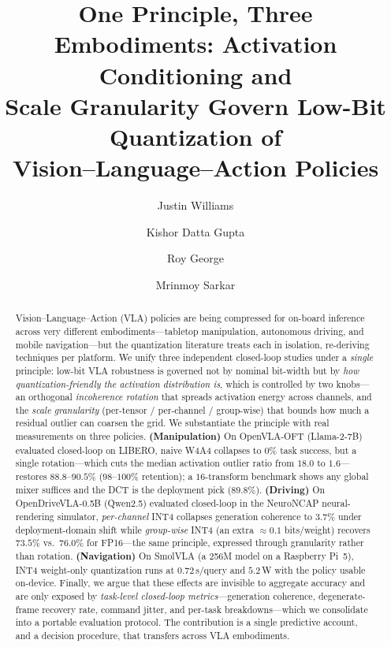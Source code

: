 \documentclass[11pt]{article}
\title{\textbf{One Principle, Three Embodiments: Activation Conditioning and\\
Scale Granularity Govern Low-Bit Quantization of\\
Vision--Language--Action Policies}}
\author[1]{Justin Williams}
\author[1]{Kishor Datta Gupta}
\author[1]{Roy George}
\author[1]{Mrinmoy Sarkar}
\affil[1]{Clark Atlanta University \quad \texttt{justinwilliamstech693@gmail.com}}
\date{}
\begin{document}
\maketitle

\begin{abstract}
Vision--Language--Action (VLA) policies are being compressed for on-board inference across very
different embodiments---tabletop manipulation, autonomous driving, and mobile navigation---but the
quantization literature treats each in isolation, re-deriving techniques per platform. We unify
three independent closed-loop studies under a \emph{single} principle: low-bit VLA robustness is
governed not by nominal bit-width but by \emph{how quantization-friendly the activation distribution
is}, which is controlled by two knobs---an orthogonal \emph{incoherence rotation} that spreads
activation energy across channels, and the \emph{scale granularity} (per-tensor / per-channel /
group-wise) that bounds how much a residual outlier can coarsen the grid. We substantiate the
principle with real measurements on three policies. \textbf{(Manipulation)} On OpenVLA-OFT
(Llama-2-7B) evaluated closed-loop on LIBERO, naive W4A4 collapses to $0\%$ task success, but a
single rotation---which cuts the median activation outlier ratio from $18.0$ to $1.6$---restores
$88.8$--$90.5\%$ ($98$--$100\%$ retention); a $16$-transform benchmark shows any global mixer
suffices and the DCT is the deployment pick ($89.8\%$). \textbf{(Driving)} On OpenDriveVLA-0.5B
(Qwen2.5) evaluated closed-loop in the NeuroNCAP neural-rendering simulator, \emph{per-channel} INT4
collapses generation coherence to $3.7\%$ under deployment-domain shift while \emph{group-wise} INT4
(an extra $\approx0.1$ bits/weight) recovers $73.5\%$ vs.\ $76.0\%$ for FP16---the same principle,
expressed through granularity rather than rotation. \textbf{(Navigation)} On SmolVLA (a 256M model on
a Raspberry Pi~5), INT4 weight-only quantization runs at $0.72$\,s/query and $5.2$\,W with the policy
usable on-device. Finally, we argue that these effects are invisible to aggregate accuracy and are
only exposed by \emph{task-level closed-loop metrics}---generation coherence, degenerate-frame
recovery rate, command jitter, and per-task breakdowns---which we consolidate into a portable
evaluation protocol. The contribution is a single predictive account, and a decision procedure, that
transfers across VLA embodiments.
\end{abstract}
\end{document}
